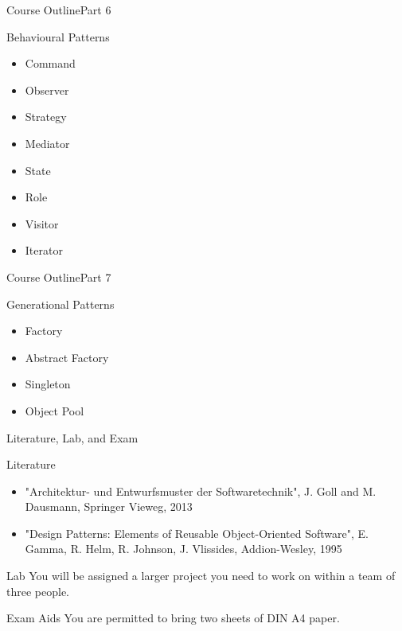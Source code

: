 \begin{frame}{Course Outline}{Part 6}
    \begin{block}{Behavioural Patterns}
       \begin{itemize}
           \item Command
           \item Observer
           \item Strategy
           \item Mediator
           \item State
           \item Role
           \item Visitor
           \item Iterator
       \end{itemize}
    \end{block}
\end{frame}

\begin{frame}{Course Outline}{Part 7}
    \begin{block}{Generational Patterns}
       \begin{itemize}
           \item Factory
           \item Abstract Factory
           \item Singleton
           \item Object Pool
       \end{itemize}
    \end{block}
\end{frame}

\begin{frame}{Literature, Lab, and  Exam}
    \begin{block}{Literature}
       \begin{itemize}
           \item "Architektur- und Entwurfsmuster der Softwaretechnik", J. Goll and M. Dausmann, Springer Vieweg, 2013
           \item "Design Patterns: Elements of Reusable Object-Oriented Software", E. Gamma, R. Helm, R. Johnson, J. Vlissides, Addion-Wesley, 1995
       \end{itemize}
    \end{block}
    \begin{block}{Lab}
	You will be assigned a larger project you need to work on within a team of three people.
    \end{block}
    \begin{alertblock}{Exam Aids}
	You are permitted to bring two sheets of DIN A4 paper.
    \end{alertblock}
\end{frame}

